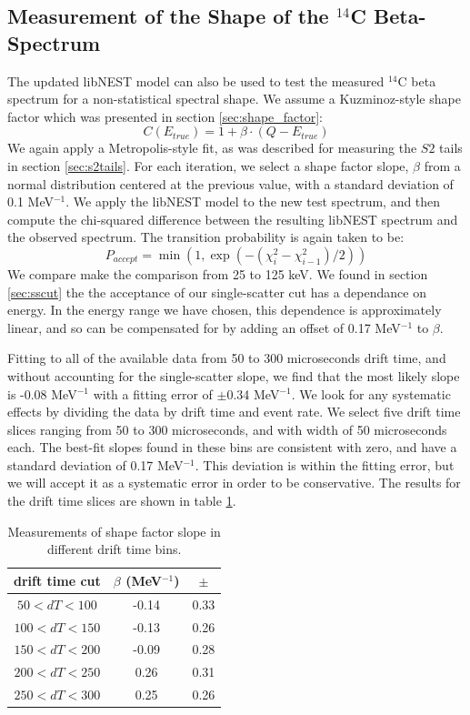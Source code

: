 \subsection{Measurement of the Shape of the $^{14}$C Beta-Spectrum}\label{sec:shape_fit}
The updated libNEST model can also be used to test the measured $^{14}$C beta spectrum for a non-statistical spectral shape. We assume a Kuzminoz-style shape factor\cite{C14_Kuzminov} which was presented in section \ref{sec:shape_factor}:
\begin{equation}
C(E_{true})=1+\beta\cdot(Q-E_{true})
\end{equation}
We again apply a Metropolis-style fit, as was described for measuring the $S2$ tails in section \ref{sec:s2tails}. For each iteration, we select a shape factor slope, $\beta$ from a normal distribution centered at the previous value, with a standard deviation of 0.1 MeV$^{-1}$. We apply the libNEST model to the new test spectrum, and then compute the chi-squared difference between the resulting libNEST spectrum and the observed spectrum. The transition probability is again taken to be:
\begin{equation}
P_{accept}=\min(1,\exp(-(\chi_i^2-\chi_{i-1}^2)/2))
\end{equation}
We compare make the comparison from 25 to 125 keV. We found in section \ref{sec:sscut} the the acceptance of our single-scatter cut has a dependance on energy. In the energy range we have chosen, this dependence is approximately linear, and so can be compensated for by adding an offset of 0.17 MeV$^{-1}$ to $\beta$.

Fitting to all of the available data from 50 to 300 microseconds drift time, and without accounting for the single-scatter slope, we find that the most likely slope is -0.08 MeV$^{-1}$ with a fitting error of $\pm$0.34 MeV$^{-1}$. We look for any systematic effects by dividing the data by drift time and event rate. We select five drift time slices ranging from 50 to 300 microseconds, and with width of 50 microseconds each. The best-fit slopes found in these bins are consistent with zero, and have a standard deviation of 0.17 MeV$^{-1}$. This deviation is within the fitting error, but we will accept it as a systematic error in order to be conservative. The results for the drift time slices are shown in table \ref{tab:shape_dt}. 
\begin{table}
\centering
\begin{tabular}{c | c | c}
\hline
drift time cut & $\beta$ (MeV$^{-1}$) & $\pm$\\
\hline\hline
$50<dT<100$ & -0.14 & 0.33\\
$100<dT<150$ & -0.13 & 0.26\\
$150<dT<200$ & -0.09 & 0.28\\
$200<dT<250$ & 0.26 & 0.31\\
$250<dT<300$ & 0.25 & 0.26\\
\hline
\end{tabular}
\caption{Measurements of shape factor slope in different drift time bins.}
\label{tab:shape_dt}
\end{table}


